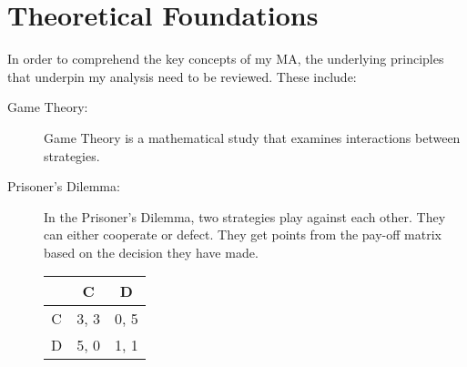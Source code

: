 \documentclass{article}
\begin{document}
\section{Theoretical Foundations}
	In order to comprehend the key concepts of my MA, the underlying principles that underpin my analysis need to be reviewed. These include:
	\begin{description}
		\item[Game Theory:] Game Theory is a mathematical study that examines interactions between strategies.
		\item[Prisoner's Dilemma:] In the Prisoner's Dilemma, two strategies play against each other. They can either cooperate or defect. They get points from the pay-off matrix based on the decision they have made.


\begin{center}
\begin{tabular}{ c|c|c }
   & C & D \\ 
   \hline
C & 3, 3 & 0, 5\\  
   \hline
 D & 5, 0 & 1, 1
\end{tabular}
\end{center}


\end{description}
\end{document}
